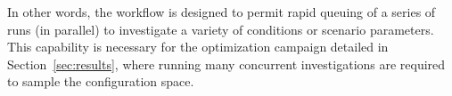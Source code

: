 In other words, the workflow is designed to permit rapid queuing of a
series of runs (in parallel) to investigate a variety of conditions or
scenario parameters. This capability is necessary for the optimization
campaign detailed in Section~\ref{sec:results}, where running many
concurrent investigations are required to sample the configuration
space.  



